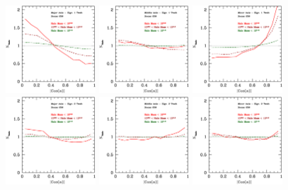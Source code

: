\documentclass[usenatbib]{mn2e}
\begin{document}
\begin{figure}
\includegraphics[width=0.30\textwidth]{../plot2/Ax1_VT/256_AX1_T1.ps}
\includegraphics[width=0.30\textwidth]{../plot2/Ax2_VT/256_AX2_T1.ps}
\includegraphics[width=0.30\textwidth]{../plot2/Ax3_VT/256_AX3_T1.ps}
\includegraphics[width=0.30\textwidth]{../plot2/Ax1_VT/256_AX1_T2.ps}
\includegraphics[width=0.30\textwidth]{../plot2/Ax2_VT/256_AX2_T2.ps}
\includegraphics[width=0.30\textwidth]{../plot2/Ax3_VT/256_AX3_T2.ps}

\end{figure}
\end{document}

